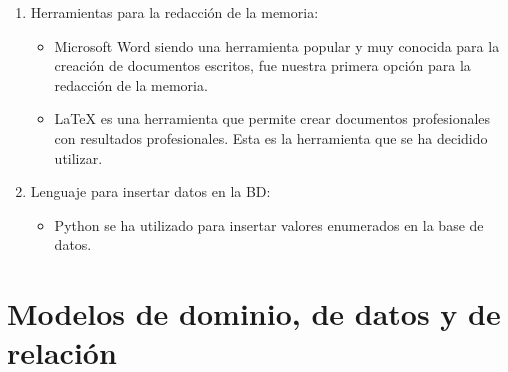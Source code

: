 \documentclass[11pt]{book}
\begin{document}
\begin{enumerate}
\begin{itemize}
		\end{itemize}
		\item Herramientas para la redacción de la memoria:
		\begin{itemize} 
			\item Microsoft Word siendo una herramienta popular y muy conocida para la creación de documentos escritos, fue nuestra primera opción para la redacción de la memoria.
			\item LaTeX es una herramienta que permite crear documentos profesionales con resultados profesionales. Esta es la herramienta que se ha decidido utilizar.
		\end{itemize}
		\item Lenguaje para insertar datos en la BD:
		\begin{itemize} 
			\item Python se ha utilizado para insertar valores enumerados en la base de datos.
		\end{itemize}
	\end{enumerate}
	
	\chapter{Modelos de dominio, de datos y de relación}\label{cap:modelos}
	
\end{document}
